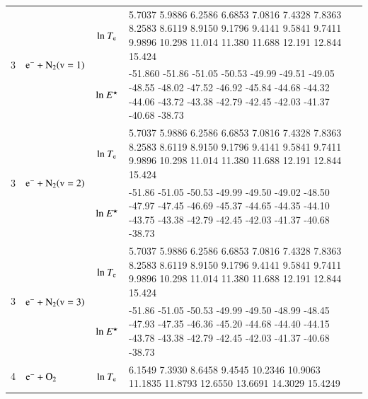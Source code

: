 \begin{table}[!htbp]
\begin{threeparttable}
\begin{tabular*}{1.1\textwidth}{l@{\extracolsep{\fill}}lcll}
  \multirow{2}{*}{3} &  \multirow{2}{*}{ $\rm e^- + N_2(v=1) $   } & ${\rm ln}~T_{\rm e}$  & \tiny              5.7037
    5.9886
    6.2586
    6.6853
    7.0816
    7.4328
    7.8363
    8.2583
    8.6119
    8.9150
    9.1796
    9.4141
    9.5841
    9.7411
    9.9896
    10.298
    11.014
    11.380
    11.688
    12.191
    12.844
    15.424
\\
  &  & ${\rm ln}~E^\star$     & \tiny           -51.860
    -51.86
    -51.05
    -50.53
    -49.99
    -49.51
    -49.05
    -48.55
    -48.02
    -47.52
    -46.92
    -45.84
    -44.68
    -44.32
    -44.06
    -43.72
    -43.38
    -42.79
    -42.45
    -42.03
    -41.37
    -40.68
    -38.73
\\
  \midrule    
  
    \multirow{2}{*}{3} &  \multirow{2}{*}{ $\rm e^- + N_2(v=2) $   } & ${\rm ln}~T_{\rm e}$  & \tiny       5.7037     5.9886
    6.2586
    6.6853
    7.0816
    7.4328
    7.8363
    8.2583
    8.6119
    8.9150
    9.1796
    9.4141
    9.5841
    9.7411
    9.9896
    10.298
    11.014
    11.380
    11.688
    12.191
    12.844
    15.424
\\
  &  & ${\rm ln}~E^\star$     & \tiny       -51.86
    -51.05
    -50.53
    -49.99
    -49.50
    -49.02
    -48.50
    -47.97
    -47.45
    -46.69
    -45.37
    -44.65
    -44.35
    -44.10
    -43.75
    -43.38
    -42.79
    -42.45
    -42.03
    -41.37
    -40.68
    -38.73
\\
  \midrule 
  
  \multirow{2}{*}{3} &  \multirow{2}{*}{ $\rm e^- + N_2(v=3) $   } & ${\rm ln}~T_{\rm e}$  & \tiny        5.7037     5.9886
    6.2586
    6.6853
    7.0816
    7.4328
    7.8363
    8.2583
    8.6119
    8.9150
    9.1796
    9.4141
    9.5841
    9.7411
    9.9896
    10.298
    11.014
    11.380
    11.688
    12.191
    12.844
    15.424
\\
  &  & ${\rm ln}~E^\star$     & \tiny        -51.86
    -51.05
    -50.53
    -49.99
    -49.50
    -48.99
    -48.45
    -47.93
    -47.35
    -46.36
    -45.20
    -44.68
    -44.40
    -44.15
    -43.78
    -43.38
    -42.79
    -42.45
    -42.03
    -41.37
    -40.68
    -38.73
\\
  \midrule 
  
  \multirow{2}{*}{4} &  \multirow{2}{*}{ $\rm e^- + O_2  $   } & ${\rm ln}~T_{\rm e}$  & \tiny         6.1549    7.3930    8.6458    9.4545   10.2346   10.9063   11.1835   11.8793   12.6550   13.6691   14.3029   15.4249 \\ 


\end{tabular*}
\end{threeparttable}
\end{table}
